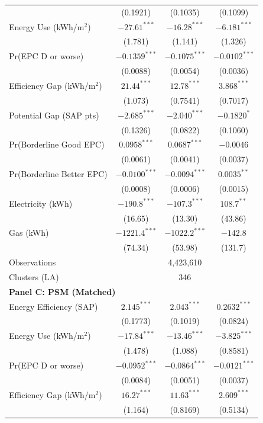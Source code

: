 \begin{table}[htbp]
\begin{tabular}{l ccc}
 & (0.1921) & (0.1035) & (0.1099) \\
Energy Use (kWh/m$^2$) & $-27.61^{***}$ & $-16.28^{***}$ & $-6.181^{***}$ \\
 & (1.781) & (1.141) & (1.326) \\
Pr(EPC D or worse) & $-0.1359^{***}$ & $-0.1075^{***}$ & $-0.0102^{***}$ \\
 & (0.0088) & (0.0054) & (0.0036) \\
Efficiency Gap (kWh/m$^2$) & $21.44^{***}$ & $12.78^{***}$ & $3.868^{***}$ \\
 & (1.073) & (0.7541) & (0.7017) \\
Potential Gap (SAP pts) & $-2.685^{***}$ & $-2.040^{***}$ & $-0.1820^{*}$ \\
 & (0.1326) & (0.0822) & (0.1060) \\
Pr(Borderline Good EPC) & $0.0958^{***}$ & $0.0687^{***}$ & $-0.0046$ \\
 & (0.0061) & (0.0041) & (0.0037) \\
Pr(Borderline Better EPC) & $-0.0100^{***}$ & $-0.0094^{***}$ & $0.0035^{**}$ \\
 & (0.0008) & (0.0006) & (0.0015) \\
Electricity (kWh) & $-190.8^{***}$ & $-107.3^{***}$ & $108.7^{**}$ \\
 & (16.65) & (13.30) & (43.86) \\
Gas (kWh) & $-1221.4^{***}$ & $-1022.2^{***}$ & $-142.8$ \\
 & (74.34) & (53.98) & (131.7) \\
\midrule
Observations & \multicolumn{3}{c}{4,423,610} \\
Clusters (LA) & \multicolumn{3}{c}{346} \\
\midrule
\multicolumn{4}{l}{\textbf{Panel C: PSM (Matched)}} \\
\midrule
Energy Efficiency (SAP) & $2.145^{***}$ & $2.043^{***}$ & $0.2632^{***}$ \\
 & (0.1773) & (0.1019) & (0.0824) \\
Energy Use (kWh/m$^2$) & $-17.84^{***}$ & $-13.46^{***}$ & $-3.825^{***}$ \\
 & (1.478) & (1.088) & (0.8581) \\
Pr(EPC D or worse) & $-0.0952^{***}$ & $-0.0864^{***}$ & $-0.0121^{***}$ \\
 & (0.0084) & (0.0051) & (0.0037) \\
Efficiency Gap (kWh/m$^2$) & $16.27^{***}$ & $11.63^{***}$ & $2.609^{***}$ \\
 & (1.164) & (0.8169) & (0.5134) \\

\end{tabular}
\end{table}
